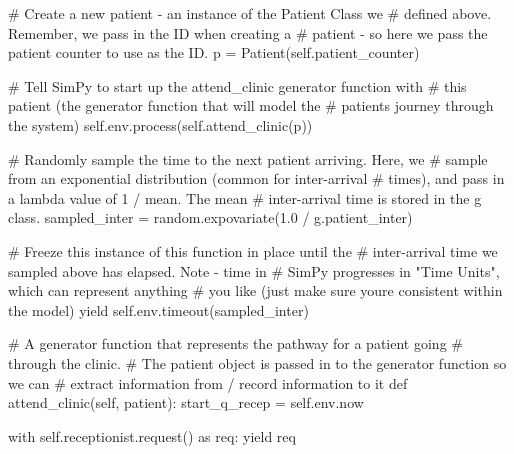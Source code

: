 \documentclass[
  letterpaper,
  DIV=11,
  numbers=noendperiod]{scrreprt}
\newenvironment{Shaded}{\begin{snugshade}}{\end{snugshade}}
\newcommand{\CommentTok}[1]{\textcolor[rgb]{0.37,0.37,0.37}{#1}}
\newcommand{\ControlFlowTok}[1]{\textcolor[rgb]{0.00,0.23,0.31}{#1}}
\newcommand{\FloatTok}[1]{\textcolor[rgb]{0.68,0.00,0.00}{#1}}
\newcommand{\ImportTok}[1]{\textcolor[rgb]{0.00,0.46,0.62}{#1}}
\newcommand{\KeywordTok}[1]{\textcolor[rgb]{0.00,0.23,0.31}{#1}}
\newcommand{\NormalTok}[1]{\textcolor[rgb]{0.00,0.23,0.31}{#1}}
\newcommand{\OperatorTok}[1]{\textcolor[rgb]{0.37,0.37,0.37}{#1}}
\newcommand{\VariableTok}[1]{\textcolor[rgb]{0.07,0.07,0.07}{#1}}
\begin{document}
\begin{tcolorbox}
\begin{Shaded}
\begin{Highlighting}[]
            \CommentTok{\# Create a new patient {-} an instance of the Patient Class we}
            \CommentTok{\# defined above.  Remember, we pass in the ID when creating a}
            \CommentTok{\# patient {-} so here we pass the patient counter to use as the ID.}
\NormalTok{            p }\OperatorTok{=}\NormalTok{ Patient(}\VariableTok{self}\NormalTok{.patient\_counter)}

            \CommentTok{\# Tell SimPy to start up the attend\_clinic generator function with}
            \CommentTok{\# this patient (the generator function that will model the}
            \CommentTok{\# patient\textquotesingle{}s journey through the system)}
            \VariableTok{self}\NormalTok{.env.process(}\VariableTok{self}\NormalTok{.attend\_clinic(p))}

            \CommentTok{\# Randomly sample the time to the next patient arriving.  Here, we}
            \CommentTok{\# sample from an exponential distribution (common for inter{-}arrival}
            \CommentTok{\# times), and pass in a lambda value of 1 / mean.  The mean}
            \CommentTok{\# inter{-}arrival time is stored in the g class.}
\NormalTok{            sampled\_inter }\OperatorTok{=}\NormalTok{ random.expovariate(}\FloatTok{1.0} \OperatorTok{/}\NormalTok{ g.patient\_inter)}

            \CommentTok{\# Freeze this instance of this function in place until the}
            \CommentTok{\# inter{-}arrival time we sampled above has elapsed.  Note {-} time in}
            \CommentTok{\# SimPy progresses in "Time Units", which can represent anything}
            \CommentTok{\# you like (just make sure you\textquotesingle{}re consistent within the model)}
            \ControlFlowTok{yield} \VariableTok{self}\NormalTok{.env.timeout(sampled\_inter)}

    \CommentTok{\# A generator function that represents the pathway for a patient going}
    \CommentTok{\# through the clinic.}
    \CommentTok{\# The patient object is passed in to the generator function so we can}
    \CommentTok{\# extract information from / record information to it}
    \KeywordTok{def}\NormalTok{ attend\_clinic(}\VariableTok{self}\NormalTok{, patient):}
\NormalTok{        start\_q\_recep }\OperatorTok{=} \VariableTok{self}\NormalTok{.env.now}

        \ControlFlowTok{with} \VariableTok{self}\NormalTok{.receptionist.request() }\ImportTok{as}\NormalTok{ req:}
            \ControlFlowTok{yield}\NormalTok{ req}


\end{Highlighting}
\end{Shaded}
\end{tcolorbox}
\end{document}
